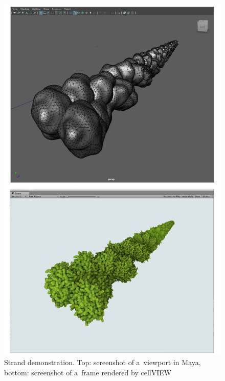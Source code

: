\documentclass[
  digital, %
  table,   %
  nolof,     %
  nolot,     %
  oneside,
]{fithesis3}
\begin{document}
\begin{figure}
  \centering
  \includegraphics[scale=0.4]{images/strand-1-vertical.jpg}
  \caption{Strand demonstration. Top: screenshot of a viewport in Maya, bottom: screenshot of a frame rendered by cellVIEW}
  \label{fig:strand1}
\end{figure}

\end{document}
